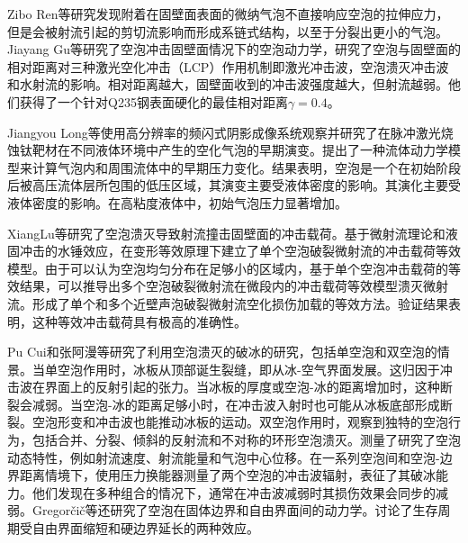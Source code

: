 Zibo Ren等研究发现附着在固壁面表面的微纳气泡不直接响应空泡的拉伸应力，但是会被射流引起的剪切流影响而形成系链式结构，以至于分裂出更小的气泡\cite{ren_strong_2021}。
Jiayang Gu等研究了空泡冲击固壁面情况下的空泡动力学，研究了空泡与固壁面的相对距离对三种激光空化冲击（LCP）作用机制即激光冲击波，空泡溃灭冲击波和水射流的影响\cite{gu_bubble_2021}。相对距离越大，固壁面收到的冲击波强度越大，但射流越弱。他们获得了一个针对Q235钢表面硬化的最佳相对距离$\gamma=0.4$。

Jiangyou Long等使用高分辨率的频闪式阴影成像系统观察并研究了在脉冲激光烧蚀钛靶材在不同液体环境中产生的空化气泡的早期演变\cite{long_early_2020}。提出了一种流体动力学模型来计算气泡内和周围流体中的早期压力变化。结果表明，空泡是一个在初始阶段后被高压流体层所包围的低压区域，其演变主要受液体密度的影响。其演化主要受液体密度的影响。在高粘度液体中，初始气泡压力显著增加。

XiangLu等研究了空泡溃灭导致射流撞击固壁面的冲击载荷\cite{lu_equivalent_2021}。基于微射流理论和液固冲击的水锤效应，在变形等效原理下建立了单个空泡破裂微射流的冲击载荷等效模型。由于可以认为空泡均匀分布在足够小的区域内，基于单个空泡冲击载荷的等效结果，可以推导出多个空泡破裂微射流在微段内的冲击载荷等效模型溃灭微射流。形成了单个和多个近壁声泡破裂微射流空化损伤加载的等效方法。验证结果表明，这种等效冲击载荷具有极高的准确性。

Pu Cui和张阿漫等研究了利用空泡溃灭的破冰的研究，包括单空泡和双空泡的情景\cite{cui_experimental_2020,cui_ice_2018}。当单空泡作用时，冰板从顶部诞生裂缝，即从冰-空气界面发展。这归因于冲击波在界面上的反射引起的张力。当冰板的厚度或空泡-冰的距离增加时，这种断裂会减弱。当空泡-冰的距离足够小时，在冲击波入射时也可能从冰板底部形成断裂。空泡形变和冲击波也能推动冰板的运动。双空泡作用时，观察到独特的空泡行为，包括合并、分裂、倾斜的反射流和不对称的环形空泡溃灭。测量了研究了空泡动态特性，例如射流速度、射流能量和气泡中心位移。在一系列空泡间和空泡-边界距离情境下，使用压力换能器测量了两个空泡的冲击波辐射，表征了其破冰能力。他们发现在多种组合的情况下，通常在冲击波减弱时其损伤效果会同步的减弱。Gregorčič等还研究了空泡在固体边界和自由界面间的动力学\cite{Gregorcic2007}。讨论了生存周期受自由界面缩短和硬边界延长的两种效应。

